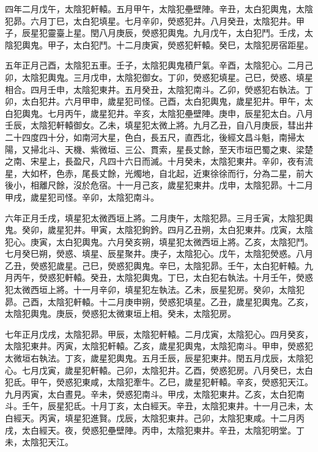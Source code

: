 \begin{pinyinscope}
 四年二月戊午，太陰犯軒轅。五月甲午，太陰犯壘壁陣。辛丑，太白犯輿鬼，太陰犯昴。六月丁巳，太白犯填星。七月辛卯，熒惑犯井。八月癸丑，太陰犯井。甲子，辰星犯靈臺上星。閏八月庚辰，熒惑犯輿鬼。九月戊午，太白犯鬥。壬戌，太陰犯輿鬼。甲子，太白犯鬥。十二月庚寅，熒惑犯軒轅。癸巳，太陰犯房宿距星。



 五年正月己酉，太陰犯五車。壬子，太陰犯輿鬼積尸氣。辛酉，太陰犯心。二月己卯，太陰犯輿鬼。三月戊申，太陰犯御女。丁卯，熒惑犯填星。己巳，熒惑、填星相合。四月壬申，太陰犯東井。五月癸丑，太陰犯南斗。乙卯，熒惑犯右執法。丁卯，太白犯井。六月甲申，歲星犯司怪。己酉，太白犯輿鬼，歲星犯井。甲午，太白犯輿鬼。七月丙午，歲星犯井。辛亥，太陰犯壘壁陣。庚申，辰星犯太白。八月壬辰，太陰犯軒轅御女。乙未，填星犯太微上將。九月乙丑，自八月庚辰，彗出井二十四度四十分，如南河大星，色白，長五尺，直西北，後經文昌斗魁，南掃太陽，又掃北斗、天機、紫微垣、三公、貫索，星長丈餘，至天市垣巴蜀之東、梁楚之南、宋星上，長盈尺，凡四十六日而滅。十月癸未，太陰犯東井。辛卯，夜有流星，大如杯，色赤，尾長丈餘，光燭地，自北起，近東徐徐而行，分為二星，前大後小，相離尺餘，沒於危宿。十一月己亥，歲星犯東井。戊申，太陰犯昴。十二月甲戌，歲星犯司怪。辛卯，太陰犯南斗。



 六年正月壬戌，填星犯太微西垣上將。二月庚午，太陰犯昴。三月壬寅，太陰犯輿鬼。癸卯，歲星犯井。甲寅，太陰犯鉤鈐。四月乙丑朔，太白犯東井。戊寅，太陰犯心。庚寅，太白犯輿鬼。六月癸亥朔，填星犯太微西垣上將。乙亥，太陰犯鬥。七月癸巳朔，熒惑、填星、辰星聚井。庚子，太陰犯心。戊午，太陰犯熒惑。八月乙丑，熒惑犯歲星。己巳，熒惑犯輿鬼。辛巳，太陰犯昴。壬午，太白犯軒轅。九月丙午，熒惑犯軒轅。癸丑，太陰犯輿鬼。丁巳，太白犯右執法。十月壬午，熒惑犯太微西垣上將。十一月辛卯，填星犯左執法。乙未，辰星犯房。癸卯，太陰犯昴。己酉，太陰犯軒轅。十二月庚申朔，熒惑犯填星。乙丑，歲星犯輿鬼。乙亥，太陰犯輿鬼。庚辰，熒惑犯太微東垣上相。癸未，太陰犯房。



 七年正月戊戌，太陰犯昴。甲辰，太陰犯軒轅。二月戊寅，太陰犯心。四月癸亥，太陰犯東井。丙寅，太陰犯軒轅。乙亥，歲星犯輿鬼，太陰犯南斗。甲申，熒惑犯太微垣右執法。丁亥，歲星犯輿鬼。五月壬辰，辰星犯東井。閏五月戊辰，太陰犯心。七月戊寅，歲星犯軒轅。己卯，太陰犯井。乙酉，熒惑犯房。八月癸巳，太白犯氐。甲午，熒惑犯東咸，太陰犯牽牛。乙巳，歲星犯軒轅。辛亥，熒惑犯天江。九月丙寅，太白晝見。辛未，熒惑犯南斗。甲戌，太陰犯東井。乙亥，太白犯南斗。壬午，辰星犯氐。十月丁亥，太白經天。辛丑，太陰犯東井。十一月己未，太白經天。丙寅，填星犯進賢。戊辰，太陰犯東井。己卯，太陰犯東咸。十二月丙戌，太白經天。夜，熒惑犯壘壁陣。丙申，太陰犯東井。辛丑，太陰犯明堂。丁未，太陰犯天江。




\end{pinyinscope}
